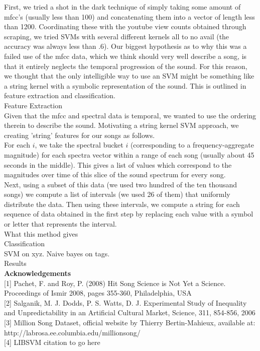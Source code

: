 \documentclass[11pt]{amsart}
\begin{document}
First, we tried a shot in the dark technique of simply taking some amount of mfcc's (usually less than 100) and concatenating them into a vector of length less than 1200. Coordinating these with the youtube view counts obtained through scraping, we tried SVMs with several different kernels all to no avail (the accuracy was always less than .6). Our biggest hypothesis as to why this was a failed use of the mfcc data, which we think should very well describe a song, is that it entirely neglects the temporal progression of the sound. For this reason, we thought that the only intelligible way to use an SVM might be something like a string kernel with a symbolic representation of the sound. This is outlined in feature extraction and classification.\\

{\huge Feature Extraction \huge} \\

Given that the mfcc and spectral data is temporal, we wanted to use the ordering therein to describe the sound. Motivating a string kernel SVM approach, we creating 'string' features for our songs as follows. \\

For each $i$, we take the spectral bucket $i$ (corresponding to a frequency-aggregate magnitude) for each spectra vector within a range of each song (usually about 45 seconds in the middle). This gives a list of values which correspond to the magnitudes over time of this slice of the sound spectrum for every song. \\

Next, using a subset of this data (we used two hundred of the ten thousand songs) we compute a list of intervals (we used 26 of them) that uniformly distribute the data. Then using these intervals, we compute a string for each sequence of data obtained in the first step by replacing each value with a symbol or letter that represents the interval. \\

What this method gives \\

{\huge Classification \huge} \\
SVM on xyz. Naive bayes on tags.\\

{\huge Results \huge} \\

{\bf Acknowledgements \bf} \\

[1] Pachet, F. and Roy, P. (2008) Hit Song Science is Not Yet a Science. Proceedings of Ismir 2008, pages 355-360, Philadelphia, USA \\

[2] Salganik, M. J. Dodds, P. S. Watts, D. J. Experimental Study of Inequality and Unpredictability in an Artificial Cultural Market, Science, 311, 854-856, 2006 \\

[3] Million Song Dataset, official website by Thierry Bertin-Mahieux, available at: \\ 
http://labrosa.ee.columbia.edu/millionsong/ \\

[4] LIBSVM citation to go here
\end{document}
